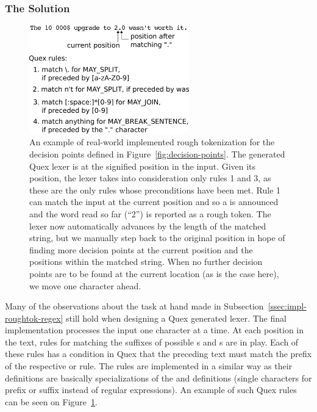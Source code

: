 \subsubsection{The Solution}
\label{ssec:impl-roughtok-solution}

\begin{figure}
  \includegraphics[width=0.618033988\textwidth]{img/quexexample.eps}
  \caption{An example of real-world implemented rough tokenization for the
           decision points defined in Figure~\ref{fig:decision-points}. The
           generated Quex lexer is at the signified position in the input.
           Given its position, the lexer takes into consideration only rules
           1 and 3, as these are the only rules whose preconditions have been
           met. Rule 1 can match the input at the current position and so a
           \maysplit{} is announced and the word read so far (``2'') is
           reported as a rough token. The lexer now automatically advances by
           the length of the matched string, but we manually step back to the
           original position in hope of finding more decision points at the
           current position and the positions within the matched string. When
           no further decision points are to be found at the current location
           (as is the case here), we move one character ahead.}
  \label{fig:quex-example}
\end{figure}

Many of the observations about the task at hand made in
Subsection~\ref{ssec:impl-roughtok-regex} still hold when designing a Quex
generated lexer. The final implementation processes the input one character at
a time. At each position in the text, rules for matching the suffixes of
possible \maysplit{}s and \mayjoin{}s are in play. Each of these rules has a
condition in Quex that the preceding text must match the prefix of the
respective \maysplit{} or \mayjoin{} rule. The \maybreaksentence{} rules
are implemented in a similar way as their definitions are basically
specializations of the \maysplit{} and \mayjoin{} definitions (single
characters for prefix or suffix instead of regular expressions). An example of
such Quex rules can be seen on Figure~\ref{fig:quex-example}.

